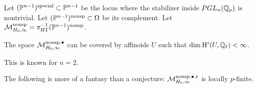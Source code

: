 Let $(\mathbb{P}^{n-1})^\text{special}\subset \mathbb{P}^{n-1}$ be the locus where the stabilizer 
inside $PGL_n(\mathbb{Q}_p)$ is nontrivial. Let 
$(\mathbb{P}^{n-1})^\text{nonsp}\subset \Omega$ be its complement. Let 
$\mathcal{M}_{H_0,\infty}^\text{nonsp} = \pi_\text{HT}^{-1}(\mathbb{P}^{n-1})^\text{nonsp}$. 

\begin{conjecture}
The space $\mathcal{M}_{H_0,\infty}^{\text{nonsp},\bullet}$ can be covered by affinoids 
$U$ such that $\dim \operatorname{H}^i(U,\mathbb{Q}_\ell)<\infty$. 
\end{conjecture}

This is known for $n=2$. 

The following is more of a fantasy than a conjecture: $\mathcal{M}_{H_0,\infty}^{\text{nonsp},\bullet,\flat}$ is locally $p$-finite. 


